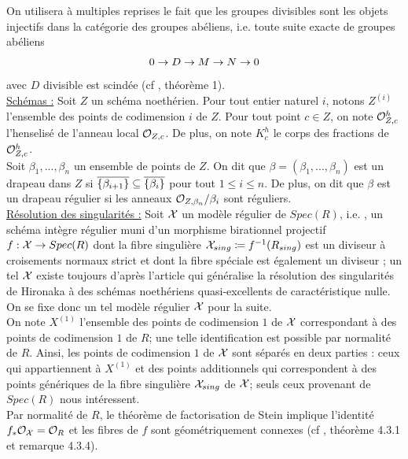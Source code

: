 \documentclass[11pt]{article}
\begin{document}
On utilisera à multiples reprises le fait que les groupes divisibles sont les objets injectifs dans la catégorie des groupes abéliens, i.e. toute suite exacte de groupes abéliens
$$
0 \rightarrow D \rightarrow M \rightarrow N \rightarrow 0
$$
avec $D$ divisible est scindée (cf \cite{Baer}, théorème 1).\\


\underline{Schémas :} Soit $Z$ un schéma noethérien. Pour tout entier naturel $i$, notons $Z^{(i)}$ l'ensemble des points de codimension $i$ de $Z$.
Pour tout point $c \in Z$, on note $\mathcal{O}^h_{Z,c}$ l'henselisé de l'anneau local $\mathcal{O}_{Z,c}$. De plus, on note $K^h_c$ le corps des fractions de $\mathcal{O}^h_{Z,c}$.\\
Soit $\beta_1,...,\beta_n$ un ensemble de points de $Z$. On dit que $\beta = (\beta_1,...,\beta_n)$ est un drapeau dans $Z$ si $\overline{\{\beta_{i+1}\}} \subseteq \overline{\{\beta_{i}\}}$ pour tout $1 \leq i \leq n$. De plus, on dit que $\beta$ est un drapeau régulier si les anneaux $\mathcal{O}_{Z,\beta_n}/\beta_i$ sont réguliers.\\

\underline{Résolution des singularités :} Soit $\mathcal{X}$ un modèle régulier de $Spec(R)$, i.e. , un schéma intègre régulier muni d'un morphisme birationnel projectif $f : \mathcal{X} \rightarrow Spec(R)$  dont la fibre singulière $\CX_{sing} \coloneqq f^{-1}(R_{sing})$ est un diviseur à croisements normaux strict et dont la fibre spéciale est également un diviseur ; un tel $\mathcal{X}$ existe toujours d'après l'article \cite{temkinDesingularizationQuasiexcellentSchemes2008} qui généralise la résolution des singularités de Hironaka à des schémas noethériens quasi-excellents de caractéristique nulle. On se fixe donc un tel modèle régulier $\mathcal{X}$ pour la suite.\\

On note $X^{(1)}$ l'ensemble des points de codimension $1$ de $\mathcal{X}$ correspondant à des points de codimension $1$ de $R$; une telle identification est possible par normalité de $R$. Ainsi, les points de codimension $1$ de $\mathcal{X}$ sont séparés en deux parties : ceux qui appartiennent à $X^{(1)}$ et des points additionnels qui correspondent à des points génériques de la fibre singulière $\mathcal{X}_{sing}$ de $\mathcal{X}$; seuls ceux provenant de $Spec(R)$ nous intéressent.\\

Par normalité de $R$, le théorème de factorisation de Stein implique l'identité $f_*\mathcal{O}_{\mathcal{X}}=\mathcal{O}_R$ et les fibres de $f$ sont géométriquement connexes (cf \cite{PMIHES_1961__11__5_0}, théorème 4.3.1 et remarque 4.3.4).
\end{document}
